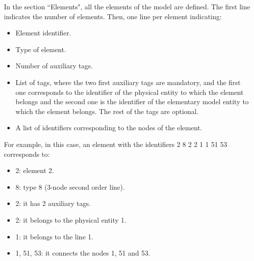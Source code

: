 \documentclass[a4]{article}
\begin{document}
In the section ``Elements", all the elements of the model are defined. The first line indicates the number of elements. Then, one line per element indicating:

\begin{itemize}
	\item Element identifier.
	\item Type of element.
	\item Number of auxiliary tags.
	\item List of tags, where the two first auxiliary tags are mandatory, and the first one corresponds to the identifier of the physical entity to which the element belongs and the second one is the identifier of the elementary model entity to which the element belongs. The rest of the tags are optional.
	\item A list of identifiers corresponding to the nodes of the element.
\end{itemize}

For example, in this case, an element with the identifiers 2 8 2 2 1 1 51 53 corresponds to:

\begin{itemize}
	\item 2: element 2.
	\item 8: type 8 (3-node second order line).
	\item 2: it has 2 auxiliary tags.
	\item 2: it belongs to the physical entity 1.
	\item 1: it belongs to the line 1.
	\item 1, 51, 53: it connects the nodes 1, 51 and 53.
\end{itemize} 
\end{document}
